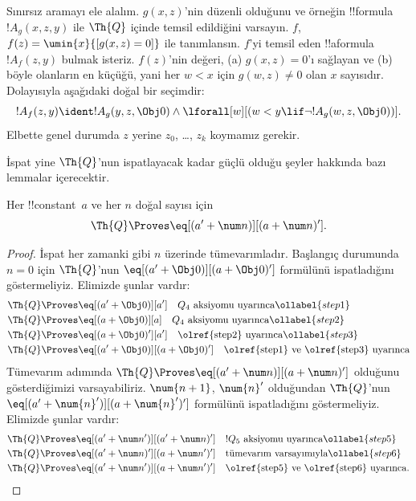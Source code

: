 


Sınırsız aramayı ele alalım. $g(x,z)$'nin düzenli olduğunu ve örneğin
!!{formula}~$!A_g(x,z,y)$ ile $\Th{Q}$ içinde temsil edildiğini varsayın.
$f$, $f(z)=\umin{x}{[g(x,z)=0]}$ ile tanımlansın. $f$'yi temsil eden
!!a{formula}~$!A_f(z,y)$ bulmak isteriz. $f(z)$'nin değeri, (a)
$g(x,z)=0$'ı sağlayan ve (b) böyle olanların en küçüğü, yani her $w<x$
için $g(w,z)\neq0$ olan $x$ sayısıdır. Dolayısıyla aşağıdaki doğal bir
seçimdir:
\[
!A_f(z,y) \ident !A_g(y, z, \Obj 0) \land \lforall[w][(w < y \lif \lnot
  !A_g(w, z, \Obj 0))].
\]
Elbette genel durumda $z$ yerine $z_0$, \dots, $z_k$ koymamız gerekir.

İspat yine $\Th{Q}$'nun ispatlayacak kadar güçlü olduğu şeyler hakkında
bazı lemmalar içerecektir.

\begin{lem}
 Her !!{constant}~$a$ ve her $n$ doğal sayısı için
\[
\Th{Q} \Proves \eq[(a' + \num n)][(a + \num n)'].
\]
\end{lem}

\begin{proof}
İspat her zamanki gibi $n$ üzerinde tümevarımladır. Başlangıç durumunda
$n=0$ için $\Th{Q}$'nun $\eq[(a'+\Obj 0)][(a+\Obj 0)']$ formülünü
ispatladığını göstermeliyiz. Elimizde şunlar vardır:
\begin{align}
  \Th{Q} & \Proves \eq[(a' + \Obj 0)][a'] \quad \text{$Q_4$ aksiyomu uyarınca}
  \ollabel{step1}\\
  \Th{Q} & \Proves  \eq[(a + \Obj 0)][a] \quad \text{$Q_4$ aksiyomu uyarınca}
  \ollabel{step2} \\
  \Th{Q} & \Proves \eq[(a + \Obj 0)'][a'] \quad \text{\olref{step2} uyarınca}
  \ollabel{step3} \\
  \Th{Q} & \Proves \eq[(a' + \Obj 0)][(a + \Obj 0)'] \quad
  \text{\olref{step1} ve \olref{step3} uyarınca}\notag
\end{align}
Tümevarım adımında $\Th{Q} \Proves
\eq[(a'+\num n)][(a+\num n)']$ olduğunu gösterdiğimizi varsayabiliriz.
$\num{n+1}$, $\num{n}'$ olduğundan $\Th{Q}$'nun
$\eq[(a'+\num{n}')][(a+\num{n}')']$ formülünü ispatladığını göstermeliyiz.
Elimizde şunlar vardır:
\begin{align}
  \Th{Q} & \Proves \eq[(a' + \num n')][(a' + \num n)'] \quad
  \text{$!Q_5$ aksiyomu uyarınca} \ollabel{step5}\\
  \Th{Q} & \Proves \eq[(a' + \num n)'][(a + \num n')'] \quad
  \text{tümevarım varsayımıyla} \ollabel{step6}\\
  \Th{Q} & \Proves \eq[(a' + \num n')][(a + \num n')'] \quad
  \text{\olref{step5} ve \olref{step6} uyarınca.} \notag
\end{align}
\end{proof}

